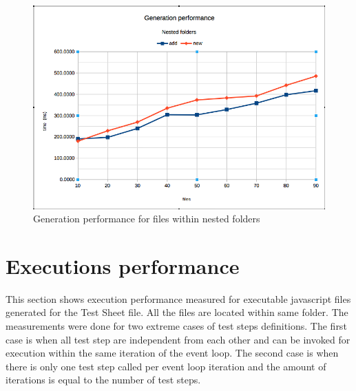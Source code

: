 \begin{figure}[ht]
	\label{fig:gn}
	\centering
	\includegraphics[width=\textwidth]{grafiken/generation_nested}
	\caption{Generation performance for files within nested folders}
\end{figure}

\section{Executions performance}
This section shows execution performance measured for executable javascript files generated for the Test Sheet file. All the files are located within same folder. The measurements were done for two extreme cases of test steps definitions. The first case is when all test step are independent from each other and can be invoked for execution within the same iteration of the event loop. The second case is when there is only one test step called per event loop iteration and the amount of iterations is equal to the number of test steps.

